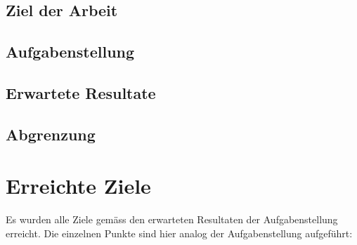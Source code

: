 \documentclass[abstracton, listof=totocnumbered,
bibliography=totocnumbered]{scrreprt}
\begin{document}
  
  
  \section{Ziel der Arbeit}

  
  
  
  \section{Aufgabenstellung}
  
  
  
  \section{Erwartete Resultate}
  
  
  
  \section{Abgrenzung}
  
  
  
  \newpage
  
  
  \chapter{Erreichte Ziele}
  
  Es wurden alle Ziele gemäss den erwarteten Resultaten der Aufgabenstellung
  erreicht. Die einzelnen Punkte sind hier analog der Aufgabenstellung
  aufgeführt:
  
\end{document}

